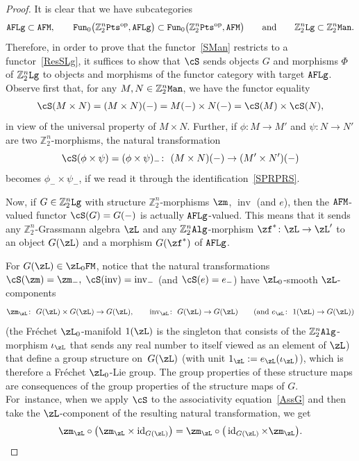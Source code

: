 \documentclass[10pt,a4paper]{amsart}
\newcommand{\op}[1]{\operatorname{#1}}
\newcommand{\Z}{{\mathbb Z}}
\newcommand{\0}{\otimes}
\newcommand{\id}{\op{id}}
\newcommand{\z}{\Z_2^n}
\numberwithin{equation}{section}
\begin{document}
\begin{proof}
It is clear that we have subcategories
\[
{\tt AFLg}\subset{\tt AFM},\qquad {\tt Fun}_0\big(\z{\tt Pts}^{\op{op}},{\tt AFLg}\big)\subset{\tt Fun}_0\big(\z{\tt Pts}^{\op{op}},{\tt AFM}\big)\qquad\text{and}\qquad{\z\tt Lg}\subset\z{\tt Man}.
\]
Therefore, in order to prove that the functor~\eqref{SMan} restricts to a functor~\eqref{ResSLg}, it suffices to show that $\cS$ sends objects $G$ and morphisms $\Phi$ of $\z{\tt Lg}$ to objects and morphisms of the functor category with target ${\tt AFLg}$.
Observe first that, for any $M,N\in\z{\tt Man}$, we have the functor equality
\begin{gather}\label{SPRPRS}
\cS(M\times N)=(M\times N)(-)=M(-)\times N(-)=\cS(M)\times\cS(N),
\end{gather}
in view of the universal property of $M\times N$. Further, if $\phi\colon M\to M'$ and $\psi\colon N\to N'$ are two $\z$-morphisms, the natural transformation
\[
\cS(\phi\times\psi)=(\phi\times\psi)_- \colon\ (M\times N)(-)\to (M'\times N')(-)
\]
 becomes $\phi_-\times\psi_-$, if we read it through the identification~\eqref{SPRPRS}.

Now, if $G\in\z{\tt Lg}$ with structure $\z$-morphisms $\zm$, $\op{inv}$ (and $e$), then the ${\tt AFM}$-valued functor $\cS(G)=G(-)$ is actually ${\tt AFLg}$-valued. This means that it sends any $\z$-Grassmann algebra $\zL$ and any $\z{\tt Alg}$-morphism $\zf^*\colon \zL\to\zL'$ to an object $G(\zL)$ and a morphism $G(\zf^*)$ of $\tt AFLg$.

For $G(\zL)\in\zL_0{\tt FM}$, notice that the natural transformations $\cS(\zm)=\zm_-,\; \cS(\op{inv})=\op{inv}_-$ (and $\cS(e)=e_-$) have $\zL_0$-smooth $\zL$-components
\[
\zm_\zL\colon\ G(\zL)\times G(\zL)\to G(\zL),\qquad \op{inv}_\zL\colon\ G(\zL)\to G(\zL)\qquad(\text{and } e_\zL\colon\ 1(\zL)\to G(\zL))
\]
 (the Fr\'echet $\zL_0$-manifold $1(\zL)$ is the singleton that consists of the $\z{\tt Alg}$-morphism $\iota_\zL$ that sends any real number to itself viewed as an element of $\zL$) that define a group structure on~$G(\zL)$ (with unit $1_\zL:=e_\zL(\iota_\zL)$), which is therefore a Fr\'echet $\zL_0$-Lie group. The group properties of these structure maps are consequences of the group properties of the structure maps of $G$. For~instance, when we apply $\cS$ to the associativity equation~\eqref{AssG} and then take the $\zL$-component of the resulting natural transformation, we get
 \[
 \zm_\zL\circ\big(\zm_\zL\times\id_{G(\zL)}\!\big)=\zm_\zL\circ\big(\id_{G(\zL)}\times\zm_\zL\big).
 \]



\end{proof}
\end{document}
